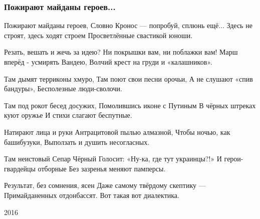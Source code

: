  
 
 

\subsubsection{Пожирают майданы героев...}
\label{sec:poetry.rus.dnr.vladislav_rusanov.majdany_pozhyrajut_geroev}

Пожирают майданы героев,
Словно Кронос --- попробуй, сплюнь ещё...
Здесь не строят, здесь ходят строем
Просветлённые свастикой юноши.

Резать, вешать и жечь за идею?
Ни покрышки вам, ни поблажки вам!
Марш вперёд - усмирять Вандею,
Волчий крест на груди и «калашников».

Там дымят терриконы хмуро,
Там поют свои песни орочьи,
А не слушают «спив бандуры»,
Бесполезные люди-сволочи.

Там под рокот бесед досужих,
Помолившись иконе с Путиным
В чёрных штреках куют оружье
И стихи слагают беспутные.

Натирают лица и руки
Антрацитовой пылью алмазной,
Чтобы ночью, как башибузуки,
Выползать и душить несогласных.

Там неистовый Сепар Чёрный
Голосит: «Ну-ка, где тут украинцы?!»
И герои-гвардейцы отборные
Без зазренья меняют памперсы.

Результат, без сомнения, ясен
Даже самому твёрдому скептику —
Примайданенных отдонбассят.
Вот такая вот диалектика.

2016 
